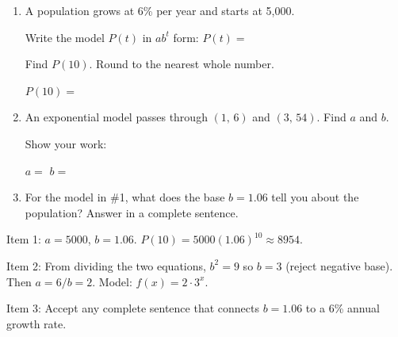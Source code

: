 \documentclass[10pt]{article}
\begin{document}
\namedateperiod

\vspace{0.14in}

\begin{enumerate}[itemsep=16pt]

\item A population grows at 6\% per year and starts at 5{,}000.

      Write the model $P(t)$ in $ab^t$ form: \quad $P(t) = $ 

      \vspace{0.06in}
      Find $P(10)$. Round to the nearest whole number.

      \vspace{0.06in}
      $P(10) = $ 

\item An exponential model passes through $(1,\,6)$ and $(3,\,54)$. Find $a$ and $b$.

      \vspace{0.06in}
      Show your work: 

      \vspace{0.06in}

      $a = $  \quad $b = $ 

\item For the model in \#1, what does the base $b = 1.06$ tell you about the population?
      Answer in a complete sentence.

      \vspace{0.06in}

\end{enumerate}

\begin{teachernote}
Item 1: $a = 5000$, $b = 1.06$. $P(10) = 5000(1.06)^{10} \approx 8954$.

Item 2: From dividing the two equations, $b^2 = 9$ so $b = 3$ (reject negative base). Then $a = 6/b = 2$. Model: $f(x) = 2 \cdot 3^x$.

Item 3: Accept any complete sentence that connects $b = 1.06$ to a 6\% annual growth rate.
\end{teachernote}
\end{document}
